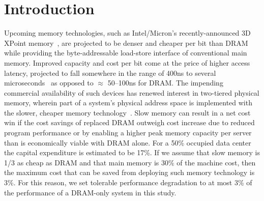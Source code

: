 \section{Introduction}
\label{introduction}

Upcoming memory technologies, such as Intel/Micron's recently-announced 3D XPoint
memory~\cite{3dcrosspoint}, are projected to be denser and cheaper per bit than DRAM while
providing the byte-addressable load-store interface of conventional main memory.
Improved capacity and cost per bit come at the price of higher access latency,
projected to fall somewhere in the range of 400ns to several
microseconds~\cite{3dcrosspoint} as opposed to $\approx$ 50--100ns for DRAM. The impending commercial availability of such
devices has renewed interest in two-tiered physical memory, wherein part of a
system's physical address space is implemented with the slower, cheaper memory
technology~\cite{ref:Dulloor:datatiering,qureshi:twolm}.  Slow memory can result in a net cost win if the cost savings of
replaced DRAM outweigh cost increase due to reduced program performance or by
enabling a higher peak memory capacity per server than is economically viable
with DRAM alone. For a 50\% occupied data center the capital expenditure is
estimated to be 17\%\cite{borosso2013}. If we assume that slow memory is 1/3 as cheap as
DRAM and that main memory is 30\% of the machine cost, then the maximum
cost that can be saved from deploying such memory technology is 3\%. For this reason, we set tolerable performance
degradation to at most 3\% of the performance of a DRAM-only system in this study.

